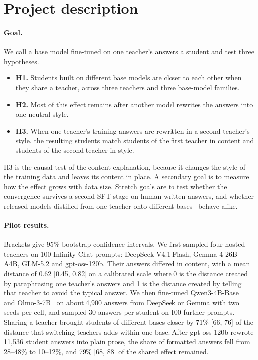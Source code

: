 \documentclass{article}
\begin{document}
\clearpage
\section{Project description}
\label{sec:description}

\paragraph{Goal.}
We call a base model fine-tuned on one teacher's answers a student and test three hypotheses.
\begin{itemize}
    \item \textbf{H1.} Students built on different base models are closer to each other when they share a teacher, across three teachers and three base-model families.
    \item \textbf{H2.} Most of this effect remains after another model rewrites the answers into one neutral style.
    \item \textbf{H3.} When one teacher's training answers are rewritten in a second teacher's style, the resulting students match students of the first teacher in content and students of the second teacher in style.
\end{itemize}
H3 is the causal test of the content explanation, because it changes the style of the training data and leaves its content in place. A secondary goal is to measure how the effect grows with data size. Stretch goals are to test whether the convergence survives a second SFT stage on human-written answers, and whether released models distilled from one teacher onto different bases~\cite{deepseek2025r1} behave alike.

\paragraph{Pilot results.}
Brackets give 95\% bootstrap confidence intervals. We first sampled four hosted teachers on 100 Infinity-Chat prompts: DeepSeek-V4.1-Flash, Gemma-4-26B-A4B, GLM-5.2 and gpt-oss-120b. Their answers differed in content, with a mean distance of 0.62 [0.45, 0.82] on a calibrated scale where 0 is the distance created by paraphrasing one teacher's answers and 1 is the distance created by telling that teacher to avoid the typical answer. We then fine-tuned Qwen3-4B-Base~\cite{yang2025qwen3} and Olmo-3-7B~\cite{olmo2025olmo3} on about 4,900 answers from DeepSeek or Gemma with two seeds per cell, and sampled 30 answers per student on 100 further prompts. Sharing a teacher brought students of different bases closer by 71\% [66, 76] of the distance that switching teachers adds within one base. After gpt-oss-120b rewrote 11,536 student answers into plain prose, the share of formatted answers fell from 28--48\% to 10--12\%, and 79\% [68, 88] of the shared effect remained.
\end{document}
